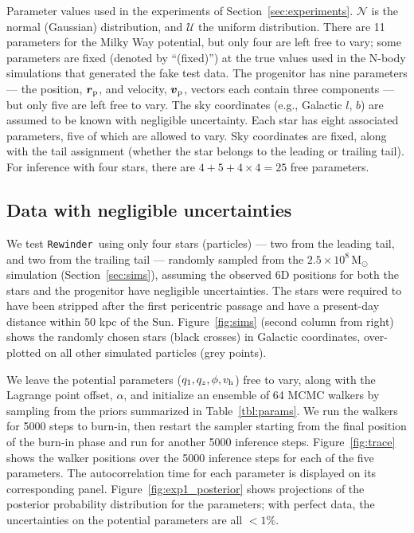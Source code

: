 \documentclass[letterpaper,12pt,preprint]{aastex}
\newcommand{\msun}{\mathrm{M}_\odot}
\newcommand{\bs}{\boldsymbol}
\newcommand{\Loffset}{\alpha}
\newcommand{\vhalo}{v_{\rm h}}
\newcommand{\rewinder}{\texttt{Rewinder}}
\begin{document}
\begin{table*}[ht]
\begin{center}
	\caption{Parameter values used in the experiments of Section~\ref{sec:experiments}. $\mathcal{N}$ is the normal (Gaussian) distribution, and $\mathcal{U}$ the uniform distribution. There are 11 parameters for the Milky Way potential, but only four are left free to vary; some parameters are fixed (denoted by ``(fixed)'') at the true values used in the N-body simulations that generated the fake test data. The progenitor has nine parameters --- the position, $\bs{r}_{\rm p}$, and velocity, $\bs{v}_{\rm p}$, vectors each contain three components --- but only five are left free to vary. The sky coordinates (e.g., Galactic $l$, $b$) are assumed to be known with negligible uncertainty. Each star has eight associated parameters, five of which are allowed to vary. Sky coordinates are fixed, along with the tail assignment (whether the star belongs to the leading or trailing tail). For inference with four stars, there are $4+5+4\times4=25$ free parameters. \label{tbl:params}}
\end{center}
\end{table*}

\subsection{Data with negligible uncertainties}\label{sec:exp1}

We test \rewinder\ using only four stars (particles) --- two from the leading tail, and two from the trailing tail --- randomly sampled from the $2.5\times10^8\,\msun$ simulation (Section~\ref{sec:sims}), assuming the observed 6D positions for both the stars and the progenitor have negligible uncertainties. The stars were required to have been stripped after the first pericentric passage and have a present-day distance within $50$ kpc of the Sun. Figure~\ref{fig:sims} (second column from right) shows the randomly chosen stars (black crosses) in Galactic coordinates, over-plotted on all other simulated particles (grey points). 

We leave the potential parameters ($q_1,q_z,\phi,\vhalo$) free to vary, along with the Lagrange point offset, $\Loffset$, and initialize an ensemble of 64 MCMC walkers by sampling from the priors summarized in Table~\ref{tbl:params}. We run the walkers for 5000 steps to burn-in, then restart the sampler starting from the final position of the burn-in phase and run for another 5000 inference steps. Figure~\ref{fig:trace} shows the walker positions over the 5000 inference steps for each of the five parameters. The autocorrelation time for each parameter is displayed on its corresponding panel. Figure~\ref{fig:exp1_posterior} shows projections of the posterior probability distribution for the parameters; with perfect data, the uncertainties on the potential parameters are all $<1\%$.
\end{document}
